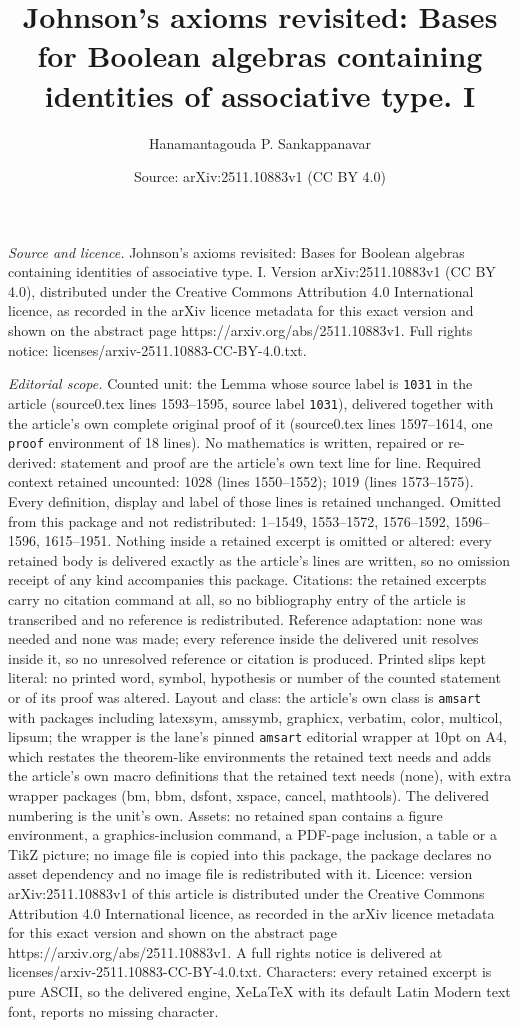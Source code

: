 \documentclass[10pt,a4paper]{amsart}
\title[Johnson's axioms revisited: Bases for Boolean algebras conta]{Johnson's axioms revisited: Bases for Boolean algebras containing identities of associative type. I}
\author{Hanamantagouda P. Sankappanavar}
\date{Source: arXiv:2511.10883v1 (CC BY 4.0)}
\begin{document}
\maketitle

\noindent\emph{Source and licence.} Johnson's axioms revisited: Bases for Boolean algebras containing identities of associative type. I. Version arXiv:2511.10883v1 (CC BY 4.0), distributed under the Creative Commons Attribution 4.0 International licence, as recorded in the arXiv licence metadata for this exact version and shown on the abstract page https://arxiv.org/abs/2511.10883v1. Full rights notice: licenses/arxiv-2511.10883-CC-BY-4.0.txt.\par\smallskip

\noindent\textit{Editorial scope.} Counted unit: the Lemma whose source label is \texttt{1031} in the article (source0.tex lines 1593--1595, source label \texttt{1031}), delivered together with the article's own complete original proof of it (source0.tex lines 1597--1614, one \texttt{proof} environment of 18 lines). No mathematics is written, repaired or re-derived: statement and proof are the article's own text line for line. Required context retained uncounted: 1028 (lines 1550--1552); 1019 (lines 1573--1575). Every definition, display and label of those lines is retained unchanged. Omitted from this package and not redistributed: 1--1549, 1553--1572, 1576--1592, 1596--1596, 1615--1951. Nothing inside a retained excerpt is omitted or altered: every retained body is delivered exactly as the article's lines are written, so no omission receipt of any kind accompanies this package. Citations: the retained excerpts carry no citation command at all, so no bibliography entry of the article is transcribed and no reference is redistributed. Reference adaptation: none was needed and none was made; every reference inside the delivered unit resolves inside it, so no unresolved reference or citation is produced. Printed slips kept literal: no printed word, symbol, hypothesis or number of the counted statement or of its proof was altered. Layout and class: the article's own class is \texttt{amsart} with packages including latexsym, amssymb, graphicx, verbatim, color, multicol, lipsum; the wrapper is the lane's pinned \texttt{amsart} editorial wrapper at 10pt on A4, which restates the theorem-like environments the retained text needs and adds the article's own macro definitions that the retained text needs (none), with extra wrapper packages (bm, bbm, dsfont, xspace, cancel, mathtools). The delivered numbering is the unit's own. Assets: no retained span contains a figure environment, a graphics-inclusion command, a PDF-page inclusion, a table or a TikZ picture; no image file is copied into this package, the package declares no asset dependency and no image file is redistributed with it. Licence: version arXiv:2511.10883v1 of this article is distributed under the Creative Commons Attribution 4.0 International licence, as recorded in the arXiv licence metadata for this exact version and shown on the abstract page https://arxiv.org/abs/2511.10883v1. A full rights notice is delivered at licenses/arxiv-2511.10883-CC-BY-4.0.txt. Characters: every retained excerpt is pure ASCII, so the delivered engine, XeLaTeX with its default Latin Modern text font, reports no missing character.
\end{document}
